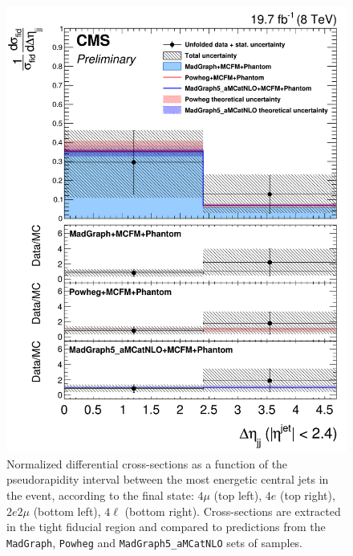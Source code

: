 \begin{figure}[hbtp]
\begin{center}
    \includegraphics[width=\cmsFigWidth]{Figures/DiffCrossSecZZTo4lCentralDeta_Unfolded_fr_MadGraph_norm.png}       
    \caption{\footnotesize{Normalized differential cross-sections as a function of the pseudorapidity interval between the most energetic central jets in the event, according to the final state: $4\mu$ (top left), $4e$ (top right), $2e2\mu$  (bottom left),  $4\ell$ (bottom right). Cross-sections are extracted in the tight fiducial region and compared to predictions from the \texttt{MadGraph}, \texttt{Powheg}  and \texttt{MadGraph5\_aMCatNLO} sets of samples.}}
    \label{fig:diff_xs_centraldeta}
  \end{center}
\end{figure}

